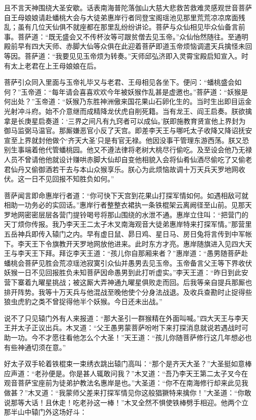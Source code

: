 \documentclass[12pt,UTF8]{ctexbook}
\begin{document}
{且不言天神围绕大圣安歇。话表南海普陀落伽山大慈大悲救苦救难灵感观世音菩萨自王母娘娘请赴蟠桃大会与大徒弟惠岸行者同登宝阁瑶池见那里荒荒凉凉席面残乱；虽有几位天仙俱不就座都在那里乱纷纷讲论。菩萨与众仙相见毕众仙备言前事。菩萨道：“既无盛会又不传杯汝等可跟贫僧去见玉帝。”众仙怡然随往。至通明殿前早有四大天师、赤脚大仙等众俱在此迎着菩萨即道玉帝烦恼调遣天兵擒怪未回等因。菩萨道：“我要见见玉帝烦为转奏。”天师邱弘济即入灵霄宝殿启知宣入。时有太上老君在上王母娘娘在后。

菩萨引众同入里面与玉帝礼毕又与老君、王母相见各坐下。便问：“蟠桃盛会如何？”玉帝道：“每年请会喜喜欢欢今年被妖猴作乱甚是虚邀也。”菩萨道：“妖猴是何出处？”玉帝道：“妖猴乃东胜神洲傲来国花果山石卵化生的。当时生出即目运金光射冲斗府。始不介意继而成精降龙伏虎自削死籍。当有龙王、阎王启奏。朕欲擒拿是长庚星启奏道：‘三界之间凡有九窍者可以成仙。’朕即施教育贤宣他上界封为御马监弼马温官。那厮嫌恶官小反了天宫。即差李天王与哪吒太子收降又降诏抚安宣至上界就封他做个‘齐天大圣’只是有官无禄。他因没事干管理东游西荡。朕又恐别生事端着他代管蟠桃园。他又不遵法律将老树大桃尽行偷吃。及至设会他乃无禄人员不曾请他他就设计赚哄赤脚大仙却自变他相貌入会将仙肴仙酒尽偷吃了又偷老君仙丹又偷御酒若干去与本山众猴享乐。朕心为此烦恼故调十万天兵天罗地网收伏。这一日不见回报不知胜负如何。”

菩萨闻言即命惠岸行者道：“你可快下天宫到花果山打探军情如何。如遇相敌可就相助一功务必的实回话。”惠岸行者整整衣裙执一条铁棍架云离阙径至山前。见那天罗地网密密层层各营门提铃喝号将那山围绕的水泄不通。惠岸立住叫：“把营门的天丁烦你传报。我乃李天王二太子木叉南海观音大徒弟惠岸特来打探军情。”那营里五岳神兵即传入辕门之内。早有虚日鼠、昴日鸡、星日马、房日兔将言传到中军帐下。李天王下令旗教开天罗地网放他进来。此时东方才亮。惠岸随旗进入见四大天王与李天王下拜。拜讫李天王道：“孩儿你自那厢来者？”惠岸道：“愚男随菩萨赴蟠桃会菩萨见胜会荒凉瑶池寂寞引众仙并愚男去见玉帝。玉帝备言父王等下界收伏妖猴一日不见回报胜负未知菩萨因命愚男到此打听虚实。”李天王道：“昨日到此安营下寨着九曜星挑战；被这厮大弄神通九曜星俱败走而回。后我等亲自提兵那厮也排开阵势。我等十万天兵与他混战至晚他使个分身法战退。及收兵查勘时止捉得些狼虫虎豹之类不曾捉得他半个妖猴。今日还未出战。”

说不了只见辕门外有人来报道：“那大圣引一群猴精在外面叫喊。”四大天王与李天王并太子正议出兵。木叉道：“父王愚男蒙菩萨吩咐下来打探消息就说若遇战时可助一功。今不才愿往看他怎么个大圣！”天王道：“孩儿你随菩萨修行这几年想必也有些神通切须在意。”

好太子双手轮着铁棍束一束绣衣跳出辕门高叫：“那个是齐天大圣？”大圣挺如意棒应声道：“老孙便是。你是甚人辄敢问我？”木叉道：“吾乃李天王第二太子叉今在观音菩萨宝座前为徒弟护教法名惠岸是也。”大圣道：“你不在南海修行却来此见我做甚？”木叉道：“我蒙师父差来打探军情见你这般猖獗特来擒你！”大圣道：“你敢说那等大话！且休走！吃老孙这一棒！”木叉全然不惧使铁棒劈手相迎。他两个立那半山中辕门外这场好斗：

}
\end{document}
